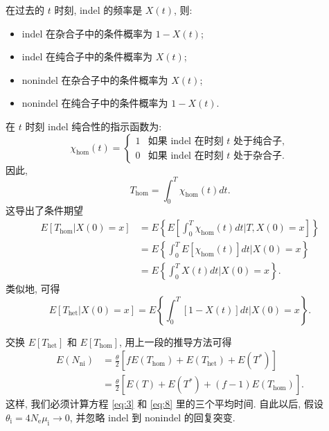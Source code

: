 \documentclass[12pt]{article}
\begin{document}
在过去的 $t$ 时刻, indel 的频率是 $X(t)$, 则:
\begin{itemize}[leftmargin=4em]
    \item indel 在杂合子中的条件概率为 $1-X(t)$;
    \item indel 在纯合子中的条件概率为 $X(t)$;
    \item nonindel 在杂合子中的条件概率为 $X(t)$;
    \item nonindel 在纯合子中的条件概率为 $1-X(t)$.
\end{itemize}
在 $t$ 时刻 indel 纯合性的指示函数为:
\begin{equation} \label{eq:4}
    \chi_\text{hom}(t) =
    {\begin{cases}
        1 & \text{如果 indel 在时刻~} t \text{~处于纯合子}, \\
        0 & \text{如果 indel 在时刻~} t \text{~处于杂合子}.
    \end{cases}}
\end{equation}
因此,
\begin{equation} \label{eq:5}
    T_\text{hom} = \int_{0}^{T} \chi_\text{hom}(t)dt \text{.}
\end{equation}
这导出了条件期望
\begin{equation} \label{eq:6}
    \begin{split}
        E[T_\text{hom} | X(0)=x]
        &= E \left\{ E\left[ \int_{0}^{T} \chi_\text{hom}(t) dt \mathrel{\Big|} T, X(0)=x  \right] \right\} \\
        &= E \left\{ \int_{0}^{T} E[\chi_\text{hom}(t)] dt \mathrel{\Big|} X(0)=x \right\} \\
        &= E \left\{ \int_{0}^{T} X(t) dt \mathrel{\Big|} X(0)=x \right\}
        \text{.}
    \end{split}
\end{equation}
类似地, 可得
\begin{equation} \label{eq:7}
    E[T_\text{het} | X(0)=x] = E \left\{ \int_{0}^{T} [1-X(t)] dt \mathrel{\Big|} X(0)=x \right\}
    \text{.}
\end{equation}

交换 $E[T_\text{het}]$ 和 $E[T_\text{hom}]$, 用上一段的推导方法可得
\begin{equation} \label{eq:8}
    \begin{split}
        E(N_\text{ni})
        &= \frac{\theta}{2} [f E(T_{\text{hom}}) + E(T_{\text{het}}) + E(T^*)] \\
        &= \frac{\theta}{2} [E(T) + E(T^*) + (f - 1) E(T_{\text{hom}})]
        \text{.}
    \end{split}
\end{equation}
这样, 我们必须计算方程 \ref{eq:3} 和 \ref{eq:8} 里的三个平均时间.
自此以后, 假设 $\theta_\text{i} = 4N_\text{e}\mu_\text{i} \rightarrow 0$,
并忽略 indel 到 nonindel 的回复突变.
\end{document}
